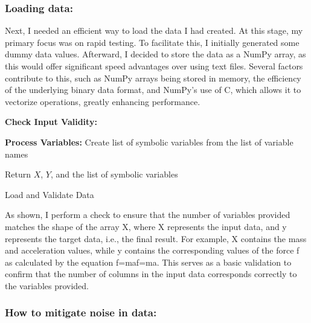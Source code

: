 \documentclass{article}
\begin{document}
\subsubsection{Loading data:}

Next, I needed an efficient way to load the data I had created. At this stage, my primary focus was on rapid testing. To facilitate this, I initially generated some dummy data values. Afterward, I decided to store the data as a NumPy array, as this would offer significant speed advantages over using text files. Several factors contribute to this, such as NumPy arrays being stored in memory, the efficiency of the underlying binary data format, and NumPy's use of C, which allows it to vectorize operations, greatly enhancing performance.\\



\begin{algorithm}[H]
\SetAlgoLined
{}

\textbf{Check Input Validity:}\;

\textbf{Process Variables:}\;
Create list of symbolic variables from the list of variable names\;

Return \(X\), \(Y\), and the list of symbolic variables\;

\caption{Load and Validate Data}
\label{alg:load_data} %
\end{algorithm}




As shown, I perform a check to ensure that the number of variables provided matches the shape of the array X, where X represents the input data, and y represents the target data, i.e., the final result. For example, X contains the mass and acceleration values, while y contains the corresponding values of the force f as calculated by the equation f=maf=ma. This serves as a basic validation to confirm that the number of columns in the input data corresponds correctly to the variables provided.\\

\subsubsection{How to mitigate noise in data: }
\end{document}
